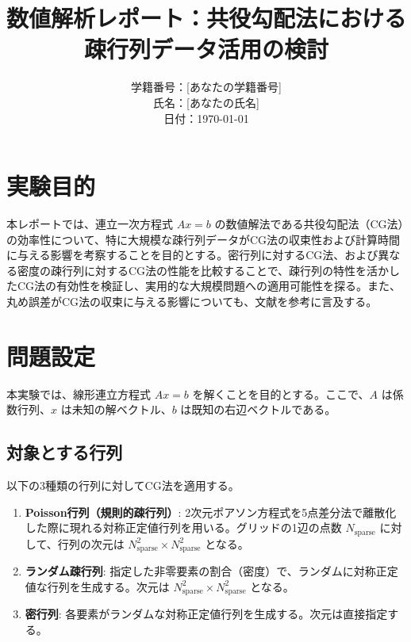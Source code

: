 \documentclass{article}
\begin{document}
\title{数値解析レポート：共役勾配法における疎行列データ活用の検討}
\author{学籍番号：[あなたの学籍番号] \\ 氏名：[あなたの氏名] \\ 日付：\today}
\date{} %

\maketitle

\section{実験目的}
本レポートでは、連立一次方程式 $Ax=b$ の数値解法である共役勾配法（CG法）の効率性について、特に大規模な疎行列データがCG法の収束性および計算時間に与える影響を考察することを目的とする。密行列に対するCG法、および異なる密度の疎行列に対するCG法の性能を比較することで、疎行列の特性を活かしたCG法の有効性を検証し、実用的な大規模問題への適用可能性を探る。また、丸め誤差がCG法の収束に与える影響についても、文献を参考に言及する。

\section{問題設定}
本実験では、線形連立方程式 $Ax=b$ を解くことを目的とする。ここで、$A$ は係数行列、$x$ は未知の解ベクトル、$b$ は既知の右辺ベクトルである。

\subsection{対象とする行列}
以下の3種類の行列に対してCG法を適用する。
\begin{enumerate}
    \item \textbf{Poisson行列（規則的疎行列）}: 2次元ポアソン方程式を5点差分法で離散化した際に現れる対称正定値行列を用いる。グリッドの1辺の点数 $N_{\text{sparse}}$ に対して、行列の次元は $N_{\text{sparse}}^2 \times N_{\text{sparse}}^2$ となる。
    \item \textbf{ランダム疎行列}: 指定した非零要素の割合（密度）で、ランダムに対称正定値な行列を生成する。次元は $N_{\text{sparse}}^2 \times N_{\text{sparse}}^2$ となる。
    \item \textbf{密行列}: 各要素がランダムな対称正定値行列を生成する。次元は直接指定する。
\end{enumerate}
\end{document}
